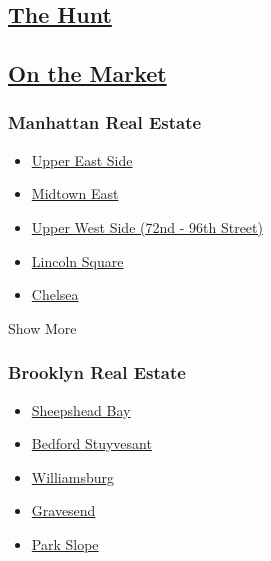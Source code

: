 \hypertarget{the-hunt}{%
\subsection{\texorpdfstring{\href{https://www.nytimes.com/column/on-the-market}{The
Hunt}}{The Hunt}}\label{the-hunt}}

\hypertarget{on-the-market}{%
\subsection{\texorpdfstring{\href{https://www.nytimes.com/column/on-the-market}{On
the Market}}{On the Market}}\label{on-the-market}}

\hypertarget{manhattan-real-estate}{%
\subsubsection{Manhattan Real Estate}\label{manhattan-real-estate}}

\begin{itemize}
\tightlist
\item
  \href{/real-estate/usa/ny/new-york/upper-east-side/homes-for-sale}{Upper
  East Side}
\item
  \href{/real-estate/usa/ny/new-york/midtown-east/homes-for-sale}{Midtown
  East}
\item
  \href{/real-estate/usa/ny/new-york/upper-west-side-(72nd-96th-street)/homes-for-sale}{Upper
  West Side (72nd - 96th Street)}
\item
  \href{/real-estate/usa/ny/new-york/lincoln-square/homes-for-sale}{Lincoln
  Square}
\item
  \href{/real-estate/usa/ny/new-york/chelsea/homes-for-sale}{Chelsea}
\end{itemize}

Show More

\hypertarget{brooklyn-real-estate}{%
\subsubsection{Brooklyn Real Estate}\label{brooklyn-real-estate}}

\begin{itemize}
\tightlist
\item
  \href{/real-estate/usa/ny/brooklyn/sheepshead-bay/homes-for-sale}{Sheepshead
  Bay}
\item
  \href{/real-estate/usa/ny/brooklyn/bedford-stuyvesant/homes-for-sale}{Bedford
  Stuyvesant}
\item
  \href{/real-estate/usa/ny/brooklyn/williamsburg/homes-for-sale}{Williamsburg}
\item
  \href{/real-estate/usa/ny/brooklyn/gravesend/homes-for-sale}{Gravesend}
\item
  \href{/real-estate/usa/ny/brooklyn/park-slope/homes-for-sale}{Park
  Slope}
\end{itemize}


